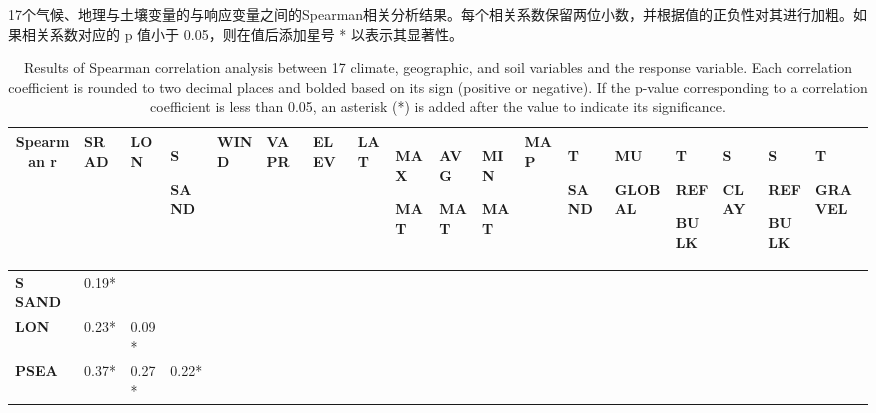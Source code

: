 \documentclass[AutoFakeBold]{LZUThesis-PgD&PhD}
\begin{document}
	
	\begin{table}[H]
		\captionsetup{
			margin=-3.17cm %
		}
		
		\caption{17个气候、地理与土壤变量的与响应变量之间的Spearman相关分析结果。每个相关系数保留两位小数，并根据值的正负性对其进行加粗。如果相关系数对应的 p 值小于 0.05，则在值后添加星号 * 以表示其显著性。 }
		\caption*{Results of Spearman correlation analysis between 17 climate, geographic, and soil variables and the response variable. Each correlation coefficient is rounded to two decimal places and bolded based on its sign (positive or negative). If the p-value corresponding to a correlation coefficient is less than 0.05, an asterisk (*) is added after the value to indicate its significance.}
		\label{tab:correlation_matrix}                                
		\tiny                                                         
		\hspace*{-3.17cm}                                             
		\begin{tabular}{p{1.6cm}p{0.68cm}p{0.68cm}p{0.68cm}p{0.68cm}p{0.68cm}p{0.68cm}p{0.68cm}p{0.68cm}p{0.68cm}p{0.68cm}p{0.68cm}p{0.68cm}p{0.68cm}p{0.68cm}p{0.68cm}p{0.68cm}p{0.68cm}}
			\toprule
			\multicolumn{1}{c}{Spearman r}  & \textbf{SRAD} & \textbf{LON} & \textbf{S} \par \textbf{SAND} & \textbf{WIND} & \textbf{VAPR} & \textbf{ELEV} & \textbf{LAT} & \textbf{MAX} \par \textbf{MAT} & \textbf{AVG} \par \textbf{MAT} & \textbf{MIN} \par \textbf{MAT} & \textbf{MAP} & \textbf{T} \par \textbf{SAND} & \textbf{MU} \par \textbf{GLOBAL} & \textbf{T} \par \textbf{REF} \par \textbf{BULK} & \textbf{S} \par \textbf{CLAY} & \textbf{S} \par \textbf{REF} \par \textbf{BULK} & \textbf{T} \par \textbf{GRAVEL} \\
			\midrule
			\textbf{S SAND} & 0.19* &  &  &  &  &  &  &  &  &  &  &  &  &  &  &  &  \\
			\textbf{LON} & 0.23* & 0.09* &  &  &  &  &  &  &  &  &  &  &  &  &  &  &  \\
			\textbf{PSEA} & 0.37* & 0.27* & 0.22* &  &  &  &  &  &  &  &  &  &  &  &  &  &  \\

\end{tabular}
\end{table}
\end{document}
